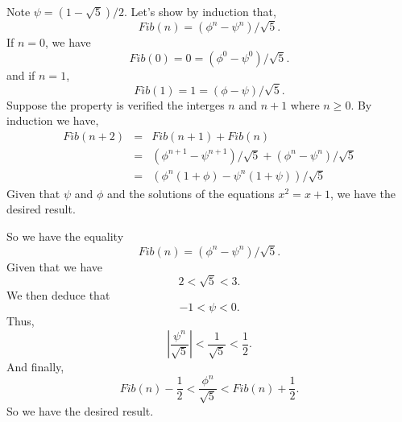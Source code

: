 \documentclass[a4paper,12pt]{article}
\begin{document}
Note $\psi = (1 - \sqrt{5})/2$.
Let's show by induction that,
\[ Fib(n) = (\phi^n - \psi^n)/\sqrt{5}.\]
If $n = 0$, we have
\[ Fib(0) = 0 = (\phi^0 - \psi^0)/\sqrt{5}.\]
and if $n = 1$,
\[ Fib(1) = 1 = (\phi - \psi)/\sqrt{5}.\]
Suppose the property is verified the interges $n$ and $n+1$ where $n
\ge 0$.  By induction we have,
\begin{eqnarray*}
Fib(n+2) &=& Fib(n+1) + Fib(n) \\ &=&
(\phi^{n+1} - \psi^{n+1})/\sqrt{5} +
(\phi^n - \psi^n)/\sqrt{5} \\ &=&
(\phi^n(1 + \phi) - \psi^n(1 + \psi))/\sqrt{5}
\end{eqnarray*}
Given that $\psi$ and $\phi$ and the solutions of the equations $x^2 =
x + 1$, we have the desired result.

\medskip
So we have the equality
\[ Fib(n) = (\phi^n - \psi^n)/\sqrt{5}.\]
Given that we have
\[ 2 < \sqrt{5} < 3.\]
We then deduce that
\[ -1 < \psi < 0.\]
Thus,
\[ \left|\frac{\psi^n}{\sqrt{5}}\right| < \frac{1}{\sqrt5} <
\frac{1}{2}.\]
And finally,
\[ Fib(n) - \frac{1}{2} < \frac{\phi^n}{\sqrt{5}} <
Fib(n) + \frac{1}{2}.\]
So we have the desired result.
\end{document}
